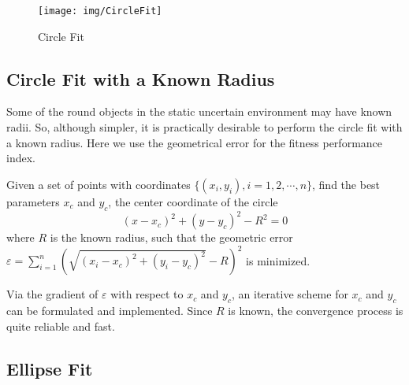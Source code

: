 \documentclass[twocolumn]{IEEEtran}
\begin{document}
\begin{figure}
    \centering
    \texttt{[image: img/CircleFit]} \caption{Circle Fit} \label{fig:CirFit}
\end{figure}



\subsection{Circle Fit with a Known Radius}
\label{sec32}


Some of the round objects in the static uncertain environment may have known radii.
So, although simpler, it is practically desirable to perform the circle fit with a known radius. Here we use the geometrical error for the fitness performance index.


Given a set of points with coordinates $\{ (x_i,y_i), i=1,2, \cdots, n\} $,   find the best parameters $x_c$ and $y_c$, the center coordinate of the circle
\[
(x-x_c)^2+(y-y_c)^2  - R^2=0
\]
where $R$ is the known radius, such that the geometric error 
 $\varepsilon = \sum_{i=1}^{n} (\sqrt{ (x_i-x_c)^2+(y_i-y_c)^2 } - R)^2$ 
is minimized.  

Via the gradient of $\varepsilon$ with respect to $x_c$ and $y_c$, an iterative scheme for  $x_c$ and $y_c$ can be formulated and implemented. Since $R$ is known, the convergence process is quite reliable and fast.
%




\subsection{Ellipse Fit}
\label{sec33}
\end{document}

